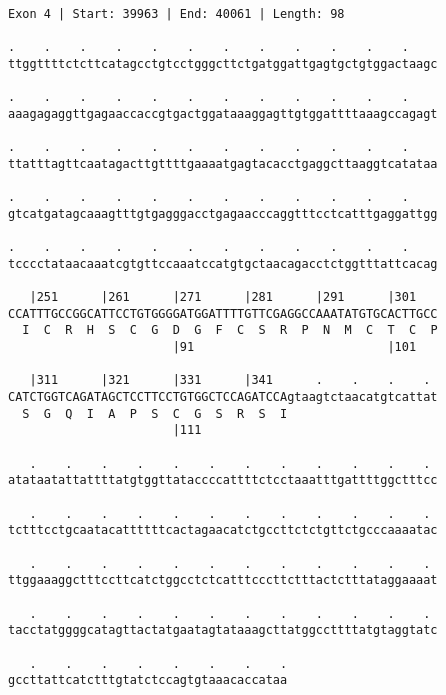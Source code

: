 \documentclass{article}
\begin{document}
\begin{Verbatim}
Exon 4 | Start: 39963 | End: 40061 | Length: 98
 
.    .    .    .    .    .    .    .    .    .    .    .    
ttggttttctcttcatagcctgtcctgggcttctgatggattgagtgctgtggactaagc
  
.    .    .    .    .    .    .    .    .    .    .    .    
aaagagaggttgagaaccaccgtgactggataaaggagttgtggattttaaagccagagt
  
.    .    .    .    .    .    .    .    .    .    .    .    
ttatttagttcaatagacttgttttgaaaatgagtacacctgaggcttaaggtcatataa
  
.    .    .    .    .    .    .    .    .    .    .    .    
gtcatgatagcaaagtttgtgagggacctgagaacccaggtttcctcatttgaggattgg
  
.    .    .    .    .    .    .    .    .    .    .    .    
tcccctataacaaatcgtgttccaaatccatgtgctaacagacctctggtttattcacag
  
   |251      |261      |271      |281      |291      |301   
CCATTTGCCGGCATTCCTGTGGGGATGGATTTTGTTCGAGGCCAAATATGTGCACTTGCC
  I  C  R  H  S  C  G  D  G  F  C  S  R  P  N  M  C  T  C  P
                       |91                           |101   
  
   |311      |321      |331      |341      .    .    .    . 
CATCTGGTCAGATAGCTCCTTCCTGTGGCTCCAGATCCAgtaagtctaacatgtcattat
  S  G  Q  I  A  P  S  C  G  S  R  S  I                     
                       |111                                 
  
   .    .    .    .    .    .    .    .    .    .    .    . 
atataatattattttatgtggttataccccattttctcctaaatttgattttggctttcc
  
   .    .    .    .    .    .    .    .    .    .    .    . 
tctttcctgcaatacattttttcactagaacatctgccttctctgttctgcccaaaatac
  
   .    .    .    .    .    .    .    .    .    .    .    . 
ttggaaaggctttccttcatctggcctctcatttcccttctttactctttataggaaaat
  
   .    .    .    .    .    .    .    .    .    .    .    . 
tacctatggggcatagttactatgaatagtataaagcttatggccttttatgtaggtatc
  
   .    .    .    .    .    .    .    .
gccttattcatctttgtatctccagtgtaaacaccataa
\end{Verbatim}
\newpage
\end{document}
